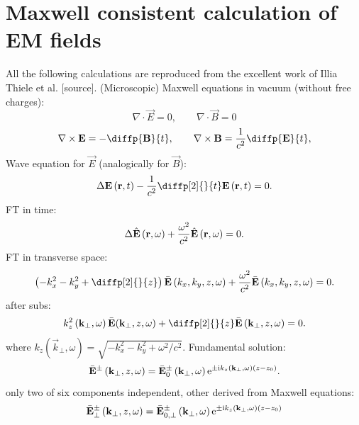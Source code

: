 \section{Maxwell consistent calculation of EM fields}
All the following calculations are reproduced from the excellent work of Illia Thiele et al. [source].
(Microscopic) Maxwell equations in vacuum (without free charges):
\begin{equation}
\nabla \cdot \vec{E} = 0, \qquad \nabla \cdot \vec{B} = 0
\end{equation}
\begin{equation}
\nabla \times \vec{E} = - \diffp{\vec{B}}{t}, \qquad \nabla \times \vec{B} = \frac{1}{c^{2}} \diffp{\vec{E}}{t},
\end{equation}
Wave equation for $ \vec{E} $ (analogically for $ \vec{B} $):
\begin{equation}
\laplace{\vec{E}} \left(\vec{r}, t \right) - \frac{1}{c^2} \diffp[2]{}{t}\vec{E} \left(\vec{r}, t \right) = 0.
\end{equation}
FT in time:
\begin{equation}
\Delta \hat{\mathbf{E}} \left(\mathbf{r}, \omega \right) + \frac{\omega^2}{c^2} \hat{\mathbf{E}} \left(\mathbf{r}, \omega \right) = 0.
\end{equation}
FT in transverse space:
\begin{equation}
\left(- k^2_x - k^2_y + \diffp[2]{}{z} \right) \bar{\vec{E}} \left(k_x, k_y, z, \omega \right) + \frac{\omega^2}{c^2} \bar{\vec{E}} \left(k_x, k_y, z, \omega \right) = 0.
\end{equation}
after subs:
\begin{equation}
k^2_z \left(\vec{k}_\bot, \omega \right) \bar{\vec{E}}(\vec{k}_\bot, z, \omega) + \diffp[2]{}{z} \bar{\vec{E}} \left(\vec{k}_\bot, z, \omega \right) = 0.
\end{equation}
where $ k_z \left(\vec{k}_\bot, \omega \right) = \sqrt{-k^2_x -k^2_y + \omega^2/c^2} $. Fundamental solution:
\begin{equation}
\bar{\mathbf{E}}^{\pm} \left(\mathbf{k}_\bot, z, \omega \right) = \bar{\mathbf{E}}_{0}^{\pm} \left(\mathbf{k}_\bot, \omega \right) \mathrm{e}^{\pm \mathrm{i} k_z \left(\mathbf{k}_\bot, \omega \right) \left(z - z_0 \right)}.
\end{equation}
only two of six components independent, other derived from Maxwell equations:
\begin{equation}
\bar{\mathbf{E}}^{\pm}_{\bot} \left(\mathbf{k}_\bot, z, \omega \right) = \bar{\mathbf{E}}^{\pm}_{0, \bot} \left(\mathbf{k}_\bot, \omega \right) \mathrm{e}^{\pm \mathrm{i} k_z \left(\mathbf{k}_\bot, \omega \right) \left(z - z_0 \right)}
\end{equation}
